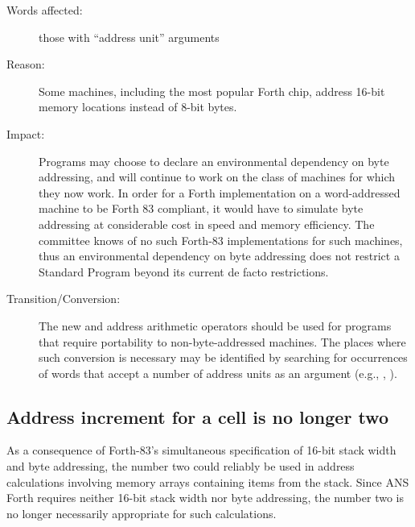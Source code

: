 \begin{description}
\item[Words affected:]
	those with ``address unit'' arguments

\item[Reason:]
	Some machines, including the most popular Forth chip, address
	16-bit memory locations instead of 8-bit bytes.

\item[Impact:]
	Programs may choose to declare an environmental dependency on
	byte addressing, and will continue to work on the class of
	machines for which they now work. In order for a Forth
	implementation on a word-addressed machine to be Forth 83
	compliant, it would have to simulate byte addressing at
	considerable cost in speed and memory efficiency. The committee
	knows of no such Forth-83 implementations for such machines,
	thus an environmental dependency on byte addressing does not
	restrict a Standard Program beyond its current de facto
	restrictions.

\item[Transition/Conversion:]
	The new  and  address arithmetic operators
	should be used for programs that require portability to
	non-byte-addressed machines. The places where such conversion is
	necessary may be identified by searching for occurrences of words
	that accept a number of address units as an argument (e.g.,
	, ).
\end{description}

\subsection{Address increment for a cell is no longer two} %

As a consequence of Forth-83's simultaneous specification of 16-bit
stack width and byte addressing, the number two could reliably be used
in address calculations involving memory arrays containing items from
the stack. Since ANS Forth requires neither 16-bit stack width nor
byte addressing, the number two is no longer necessarily appropriate
for such calculations.

